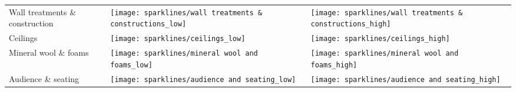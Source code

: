 \begin{table}
\begin{tabularx}{\textwidth}{Xll}
    Wall treatments \& construction    & \texttt{[image: sparklines/wall treatments \& constructions\_low]} & \texttt{[image: sparklines/wall treatments \& constructions\_high]} \\ 
    Ceilings                           & \texttt{[image: sparklines/ceilings\_low]}                        & \texttt{[image: sparklines/ceilings\_high]}                        \\ 
    Mineral wool \& foams              & \texttt{[image: sparklines/mineral wool and foams\_low]}          & \texttt{[image: sparklines/mineral wool and foams\_high]}          \\ 
    Audience \& seating                & \texttt{[image: sparklines/audience and seating\_low]}            & \texttt{[image: sparklines/audience and seating\_high]}            \\ 
    \bottomrule
    \end{tabularx}\label{tab:absorption-coeffs}
\end{table}